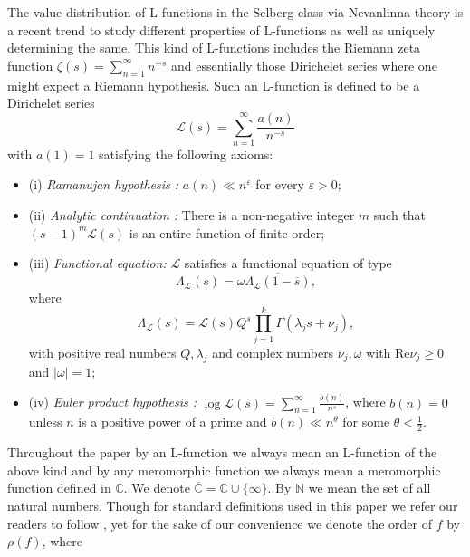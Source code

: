 \documentclass[a4paper,draft]{amsproc}
\theoremstyle{plain}
\theoremstyle{definition}
\theoremstyle{remark}
\newcommand{\ol}{\overline}
\newcommand{\be}{\begin{equation}}
\newcommand{\ee}{\end{equation}}
\numberwithin{equation}{section}
\begin{document}
	 The value distribution  of L-functions in the Selberg class via Nevanlinna theory is a recent trend to study different properties of L-functions as well as uniquely determining the same. This kind of L-functions includes the Riemann zeta function $\zeta(s) = \sum\limits_{n=1}^{\infty} n^{-s}$ and essentially those Dirichelet series where one might expect a Riemann hypothesis. Such an L-function is
	defined \cite{selberg1992,steuding2007value} to be a Dirichelet series
	\be\nonumber
	\mathcal{L}(s) = \sum\limits_{n=1}^{\infty} \frac{a(n)}{ n^{-s}}
	\ee
	with $a(1)=1$ satisfying the following axioms:
	\begin{itemize}
		\item(i) \emph{Ramanujan hypothesis :} $a(n)\ll n^{\varepsilon}$ for every $\varepsilon> 0;$
		\item(ii) \emph{Analytic continuation :} There is a non-negative integer $m$ such that\\ $(s-1)^m\mathcal{L}(s)$ is an entire function of
		finite order;
		\item (iii) \emph{Functional equation:} $\mathcal{L}$ satisfies a functional equation of type \begin{equation*}
			\Lambda_\mathcal{L}(s) = \omega\ol{ \Lambda_\mathcal{L}(1-\ol{s})},
		\end{equation*}
		where \begin{equation*}
			\Lambda_\mathcal{L}(s) = \mathcal{L}(s)Q^s\prod_{j=1}^{k}\Gamma(\lambda_js+\nu_j),
		\end{equation*}
		with positive real numbers $Q, \lambda_j$ and complex numbers $ \nu_j, \omega$ with Re$\nu_j \geq 0$ and $|\omega| = 1;$
		\item (iv) \emph{Euler product hypothesis :} $\log \mathcal{L}(s) =  \sum\limits_{n=1}^{\infty} \frac{b(n)}{ n^{s}}$,  where $b(n) = 0$ unless $n$ is a positive power of a prime
		and $b(n) \ll n^{\theta}$ for some $\theta < \frac{1}{2}$.
	\end{itemize}
	\par Throughout the paper by an L-function we always mean an L-function of the above kind and by any meromorphic function we always mean a meromorphic function defined in $\mathbb{C}$. We denote $\mathbb{\ol C}=\mathbb{C}\cup\{\infty\}$. By $\mathbb{N}$ we  mean the set of all natural numbers.  Though for standard definitions used in this paper we refer our readers to follow \cite{wkh}, yet for the sake of our convenience we denote the order of $f$ by $\rho(f)$, where 
\end{document}
